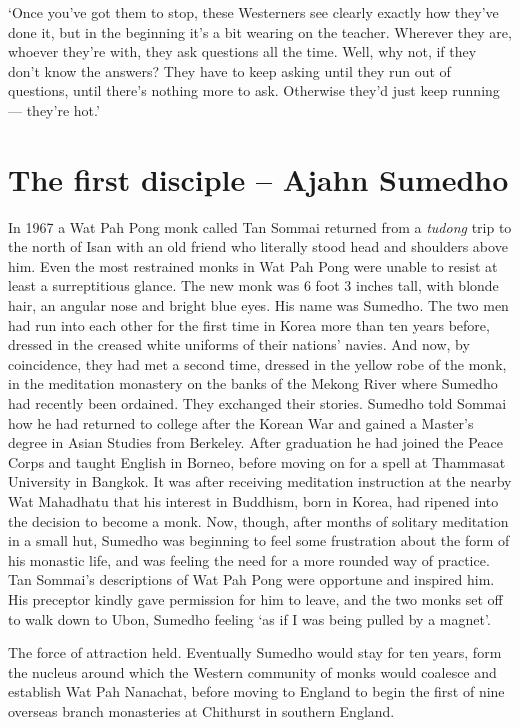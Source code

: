 `Once you've got them to stop, these Westerners see clearly exactly how
they've done it, but in the beginning it's a bit wearing on the teacher.
Wherever they are, whoever they're with, they ask questions all the
time. Well, why not, if they don't know the answers? They have to keep
asking until they run out of questions, until there's nothing more to
ask. Otherwise they'd just keep running --- they're hot.'

\section{The first disciple -- Ajahn Sumedho}

In 1967 a Wat Pah Pong monk called Tan Sommai returned from a
\emph{tudong} trip to the north of Isan with an old friend who literally
stood head and shoulders above him. Even the most restrained monks in
Wat Pah Pong were unable to resist at least a surreptitious glance. The
new monk was 6 foot 3 inches tall, with blonde hair, an angular nose and
bright blue eyes. His name was Sumedho. The two men had run into each
other for the first time in Korea more than ten years before, dressed in
the creased white uniforms of their nations' navies. And now, by
coincidence, they had met a second time, dressed in the yellow robe of
the monk, in the meditation monastery on the banks of the Mekong River
where Sumedho had recently been ordained. They exchanged their stories.
Sumedho told Sommai how he had returned to college after the Korean War
and gained a Master's degree in Asian Studies from Berkeley. After
graduation he had joined the Peace Corps and taught English in Borneo,
before moving on for a spell at Thammasat University in Bangkok. It was
after receiving meditation instruction at the nearby Wat Mahadhatu that
his interest in Buddhism, born in Korea, had ripened into the decision
to become a monk. Now, though, after months of solitary meditation in a
small hut, Sumedho was beginning to feel some frustration about the form
of his monastic life, and was feeling the need for a more rounded way of
practice. Tan Sommai's descriptions of Wat Pah Pong were opportune and
inspired him. His preceptor kindly gave permission for him to leave, and
the two monks set off to walk down to Ubon, Sumedho feeling `as if I was
being pulled by a magnet'.

The force of attraction held. Eventually Sumedho would stay for ten
years, form the nucleus around which the Western community of monks
would coalesce and establish Wat Pah Nanachat, before moving to
England to begin the first of nine overseas branch monasteries at
Chithurst in southern England.

